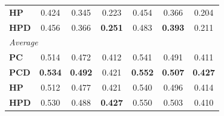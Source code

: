 \begin{table}[t!]
\begin{tabular}{lccc|ccc}
\textbf{HP} & 0.424 & 0.345 & 0.223 & 0.454 & 0.366 & 0.204 \\
\textbf{HPD} & 0.456 & 0.366 & \textbf{0.251} & 0.483 & \textbf{0.393} & 0.211 \\
\midrule
\multicolumn{7}{l}{\textit{Average}} \\
\textbf{PC} & 0.514 & 0.472 & 0.412 & 0.541 & 0.491 & 0.411 \\
\textbf{PCD} & \textbf{0.534} & \textbf{0.492} & 0.421 & \textbf{0.552} & \textbf{0.507} & \textbf{0.427} \\
\textbf{HP} & 0.512 & 0.477 & 0.421 & 0.540 & 0.496 & 0.414 \\
\textbf{HPD} & 0.530 & 0.488 & \textbf{0.427} & 0.550 & 0.503 & 0.410 \\
\bottomrule
\end{tabular}
\end{table}
